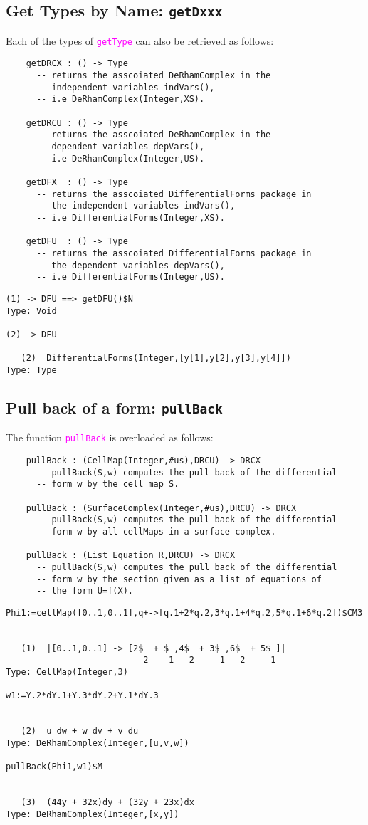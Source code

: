 \documentclass[12pt,a4paper]{article}
\newcommand{\spadfun}[1]{\textcolor{magenta}{\tt #1}}
\begin{document}
\subsection{Get Types by Name: {\tt getDxxx}}
Each of the types of \spadfun{getType} can also be retrieved
as follows:
\begin{lstlisting}
    getDRCX : () -> Type
      -- returns the asscoiated DeRhamComplex in the 
      -- independent variables indVars(), 
      -- i.e DeRhamComplex(Integer,XS).
      
    getDRCU : () -> Type
      -- returns the asscoiated DeRhamComplex in the 
      -- dependent variables depVars(), 
      -- i.e DeRhamComplex(Integer,US).   
      
    getDFX  : () -> Type    
      -- returns the asscoiated DifferentialForms package in 
      -- the independent variables indVars(), 
      -- i.e DifferentialForms(Integer,XS).
      
    getDFU  : () -> Type
      -- returns the asscoiated DifferentialForms package in 
      -- the dependent variables depVars(), 
      -- i.e DifferentialForms(Integer,US).
\end{lstlisting}
\scriptsize
\begin{verbatim}
(1) -> DFU ==> getDFU()$N
Type: Void

(2) -> DFU

   (2)  DifferentialForms(Integer,[y[1],y[2],y[3],y[4]])
Type: Type
\end{verbatim}
\normalsize
%
\subsection{Pull back of a form: {\tt pullBack}}
The function \spadfun{pullBack} is overloaded as follows:
\begin{lstlisting}
    pullBack : (CellMap(Integer,#us),DRCU) -> DRCX
      -- pullBack(S,w) computes the pull back of the differential
      -- form w by the cell map S.
      
    pullBack : (SurfaceComplex(Integer,#us),DRCU) -> DRCX
      -- pullBack(S,w) computes the pull back of the differential
      -- form w by all cellMaps in a surface complex.

    pullBack : (List Equation R,DRCU) -> DRCX
      -- pullBack(S,w) computes the pull back of the differential
      -- form w by the section given as a list of equations of 
      -- the form U=f(X).
\end{lstlisting}
\scriptsize
\begin{verbatim}
Phi1:=cellMap([0..1,0..1],q+->[q.1+2*q.2,3*q.1+4*q.2,5*q.1+6*q.2])$CM3
 

   (1)  |[0..1,0..1] -> [2$  + $ ,4$  + 3$ ,6$  + 5$ ]|
                           2    1   2     1   2     1
Type: CellMap(Integer,3)

w1:=Y.2*dY.1+Y.3*dY.2+Y.1*dY.3
 

   (2)  u dw + w dv + v du
Type: DeRhamComplex(Integer,[u,v,w])

pullBack(Phi1,w1)$M 
 

   (3)  (44y + 32x)dy + (32y + 23x)dx
Type: DeRhamComplex(Integer,[x,y])
\end{verbatim}
\normalsize
%
\end{document}
